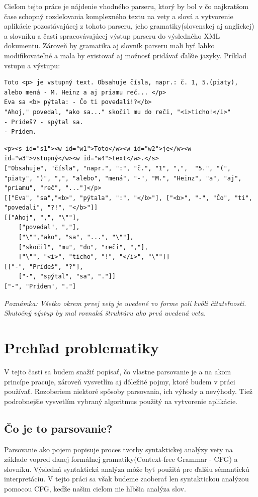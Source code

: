 \documentclass[12pt,a4paper]{report}
\theoremstyle{definition}
\theoremstyle{remark}
\begin{document}
Cieľom tejto práce je nájdenie vhodného parseru, ktorý by bol v čo najkratšom čase schopný rozdeľovania komplexného textu na vety a slová a vytvorenie aplikácie pozostávajúcej z tohoto parseru, jeho gramatiky(slovenskej aj anglickej) a slovníku a časti spracovávajúcej výstup parseru do výsledného XML dokumentu. Zároveň by gramatika aj slovník parseru mali byť ľahko modifikovateľné a mala by existovať aj možnosť pridávať ďalšie jazyky. Príklad vstupu a výstupu:
\begin{lstlisting}[caption={Vstup},style=htmlcssjs, label={lst:vstup}]
Toto <p> je vstupný text. Obsahuje čísla, napr.: č. 1, 5.(piaty), alebo mená - M. Heinz a aj priamu reč... </p>
Eva sa <b> pýtala: - Čo ti povedali!?</b>
"Ahoj," povedal, "ako sa..." skočil mu do reči, "<i>ticho!</i>"
- Prídeš? - spýtal sa.
- Prídem.
\end{lstlisting}
\begin{lstlisting}[caption={Výstup},style=htmlcssjs, label={lst:vystup}]
<p><s id="s1"><w id="w1">Toto</w><w id="w2">je</w><w id="w3">vstupný</w><w id="w4">text</w>.</s>
["Obsahuje", "čísla", "napr.", ":", "č.", "1", ",",  "5.", "(", "piaty", ")", ",", "alebo", "mená", "-", "M.", "Heinz", "a", "aj", "priamu", "reč", "..."]</p>
[["Eva", "sa","<b>", "pýtala", ":", "</b>"], ["<b>", "-", "Čo", "ti", "povedali", "?!", "</b>"]]
[["Ahoj", ",", "\""],
	["povedal", ","],
	["\"","ako", "sa", "...", "\""],
	["skočil", "mu", "do", "reči", ","],
	["\"", "<i>", "ticho", "!", "</i>", "\""]]
[["-", "Prídeš", "?"],
	["-", "spýtal", "sa", "."]]
["-", "Prídem", "."]
\end{lstlisting}
\noindent \textit{Poznámka: Všetko okrem prvej vety je uvedené vo forme polí kvôli čitateľnosti. Skutočný výstup by mal rovnakú štruktúru ako prvá uvedená veta.}

\section{Prehľad problematiky}
V tejto časti sa budem snažiť popísať, čo vlastne parsovanie je a na akom princípe pracuje, zároveň vysvetlím aj dôležité pojmy, ktoré budem v práci používať. Rozoberiem niektoré spôsoby parsovania, ich výhody a nevýhody. Tiež podrobnejšie vysvetlím vybraný algoritmus použitý na vytvorenie aplikácie.

\subsection{Čo je to parsovanie?}
Parsovanie ako pojem popisuje proces tvorby syntaktickej analýzy vety na základe vopred danej formálnej gramatiky(Context-free Grammar - CFG) a slovníku. Výsledná  syntaktická analýza môže byť použitá pre ďalšiu sémantickú interpretáciu. V tejto práci sa však budeme zaoberať len syntaktickou analýzou pomocou CFG, keďže našim cieľom nie hlbšia analýza slov. \cite{Pulman}\cite{Girju}
\end{document}

